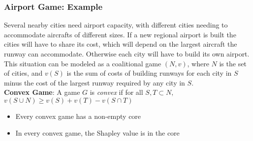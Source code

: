 \subsubsection{Airport Game: Example}
Several nearby cities need airport capacity, with different cities needing to accommodate aircrafts of different sizes. If a new regional airport is built the cities will have to share its cost, which will depend on the largest aircraft the runway can accommodate. Otherwise each city will have to build its own airport.\\
This situation can be modeled as a coalitional game $(N, v)$, where $N$ is the set of cities, and $v(S)$ is the sum of costs of building runways for each city in $S$ minus the cost of the largest runway required by any city in $S$.\\
\newline
\textbf{Convex Game}: A game $G$ is \textit{convex} if for all $S, T \subset N,$  $ v(S\cup N) \geq v(S)+ v(T) - v(S \cap T)$
\begin{itemize}
\item Every convex game has a non-empty core
\item In every convex game, the Shapley value is in the core
\end{itemize}